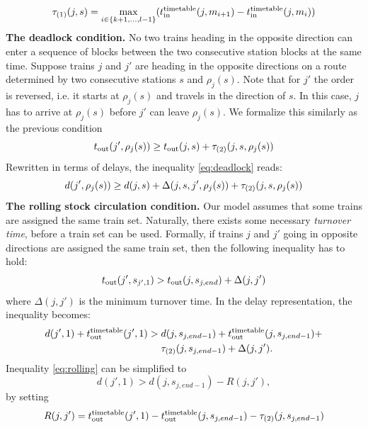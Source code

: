 \begin{equation}
	\tau_{(1)}(j, s) = \max_{i \in \{k+1,\ldots,l-1\}}(t_\text{in}^\text{timetable}(j, m_{i+1}) - t_\text{in}^\text{timetable}(j, m_i))
\end{equation}
\textbf{The deadlock condition.} No two trains heading in the opposite direction can enter
a sequence of blocks between the two consecutive station blocks at the same time. Suppose trains $j$
and $j'$ are heading in the opposite directions on a route determined by two consecutive stations
$s$ and $\rho_j(s)$. Note that for $j'$ the order is reversed, i.e. it starts at $\rho_j(s)$ and
travels in the direction of $s$. In this case, $j$ has to arrive at $\rho_j(s)$ before $j'$ can
leave $\rho_j(s)$. We formalize this similarly as the previous condition
\begin{equation}
	\label{eq:deadlock}
	t_\text{out}(j', \rho_j(s)) \ge t_\text{out}(j,s) + \tau_{(2)}(j, s, \rho_j(s))
\end{equation}
Rewritten in terms of delays, the inequality \eqref{eq:deadlock} reads:
\begin{equation}
  \label{eq:deadlock2}
	d(j',\rho_j(s)) \ge d(j, s) + \Delta(j,s,j',\rho_j(s)) + \tau_{(2)}(j, s, \rho_j(s))
\end{equation}
\textbf{The rolling stock circulation condition.} Our model assumes that some trains are
assigned the same train set. Naturally, there exists some necessary \emph{turnover time},
before a train set can be used. Formally, if trains $j$ and $j'$ going in opposite
directions are assigned the same train set, then the following inequality has to hold:
\begin{equation}
t_\text{out}(j', s_{j',1}) > t_\text{out}(j, s_{j,end}) + \Delta(j, j')
\end{equation}
where $\Delta(j, j')$ is the minimum turnover time. In the delay representation, the
inequality becomes:
\begin{equation}
\label{eq:rolling}
\begin{split}
  d(j',1) + t_\text{out}^\text{timetable}(j',1) > & \; d(j, s_{j,end-1}) + t_\text{out}^\text{timetable}(j, s_{j,end-1}) + \\
                           & \; \tau_{(2)}(j, s_{j,end-1}) + \Delta(j,j').
\end{split}
\end{equation}
Inequality \eqref{eq:rolling} can be simplified to
\begin{equation}
  d(j',1) > d(j, s_{j,end-1}) - R(j,j'),
\end{equation}
by setting
\begin{equation}
  \label{eq:rolling2}
  R(j, j') = t_\text{out}^\text{timetable}(j',1) - t_\text{out}^\text{timetable}(j, s_{j,end-1}) - \tau_{(2)}(j,s_{j,end-1})
\end{equation}
